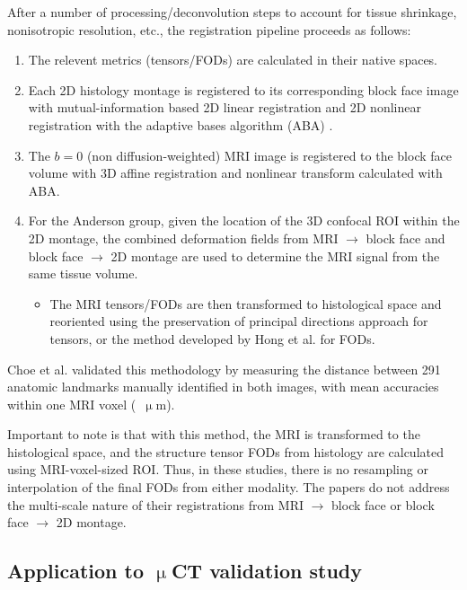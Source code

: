 \documentclass[11pt]{article}
\begin{document}
After a number of processing/deconvolution steps to account for tissue shrinkage,
nonisotropic resolution, etc., the registration pipeline proceeds as follows:
\begin{enumerate}
\item The relevent metrics (tensors/FODs) are calculated in their native spaces. 
\item Each 2D histology montage is registered to its corresponding block face
  image with mutual-information based 2D linear registration and 2D nonlinear
  registration with the adaptive bases algorithm (ABA) \cite{Rohde2003}.
\item The $b=0$ (non diffusion-weighted) MRI image is registered to the block
  face volume with 3D affine registration and nonlinear transform
  calculated with ABA.
\item For the Anderson group, given the location of the 3D confocal ROI within
  the 2D montage, the combined deformation fields from MRI $\rightarrow$ block
  face and block face $\rightarrow$ 2D montage are used to determine the MRI
  signal from the same tissue volume.
  \begin{itemize}
  \item The MRI tensors/FODs are then transformed to histological space and
    reoriented using the preservation of principal directions approach
    \cite{Alexander2001} for tensors, or the method developed by Hong et
    al. \cite{Hong2009} for FODs.
  \end{itemize}
\end{enumerate}

Choe et al. validated this methodology by measuring the distance between 291
anatomic landmarks manually identified in both images, with mean accuracies
within one MRI voxel (~$\upmu$m).

Important to note is that with this method, the MRI is transformed to the
histological space, and the structure tensor FODs from histology are calculated
using MRI-voxel-sized ROI. Thus, in these studies, there is no resampling or
interpolation of the final FODs from either modality. The papers do not address
the multi-scale nature of their registrations from MRI $\rightarrow$ block face
or block face $\rightarrow$ 2D montage. 

\subsection{Application to $\upmu$CT validation study}
\end{document}
